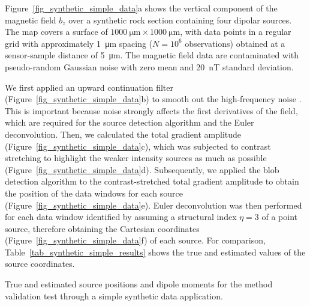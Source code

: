 Figure~\ref{fig_synthetic_simple_data}a shows the vertical component of the magnetic field $b_z$ over a synthetic rock section containing four dipolar sources.
The map covers a surface of $\qty{1000}{\um} \times \qty{1000}{\um}$, with data points in a regular grid with approximately \qty{1}{\um} spacing ($N = 10^6$ observations) obtained at a sensor-sample distance of \qty{5}{\um}.
The magnetic field data are contaminated with pseudo-random Gaussian noise with zero mean and \qty{20}{\nano\tesla} standard deviation.

We first applied an upward continuation filter (Figure~\ref{fig_synthetic_simple_data}b) to smooth out the high-frequency noise \citep{Blakely1996}.
This is important because noise strongly affects the first derivatives of the field, which are required for the source detection algorithm and the Euler deconvolution.
Then, we calculated the total gradient amplitude (Figure~\ref{fig_synthetic_simple_data}c), which was subjected to contrast stretching to highlight the weaker intensity sources as much as possible (Figure~\ref{fig_synthetic_simple_data}d).
Subsequently, we applied the blob detection algorithm to the contrast-stretched total gradient amplitude to obtain the position of the data windows for each source (Figure~\ref{fig_synthetic_simple_data}e).
Euler deconvolution was then performed for each data window identified by assuming a structural index $\eta = 3$ of a point source, therefore obtaining the Cartesian coordinates (Figure~\ref{fig_synthetic_simple_data}f) of each source. For comparison, Table~\ref{tab_synthetic_simple_results} shows the true and estimated values of the source coordinates.

\begin{table}[tb!]
  \begin{center}
    \small
    
  \end{center}
  \caption{
    True and estimated source positions and dipole moments for the method validation test through a simple synthetic data application.
  }
  \label{tab_synthetic_simple_results}
\end{table}

